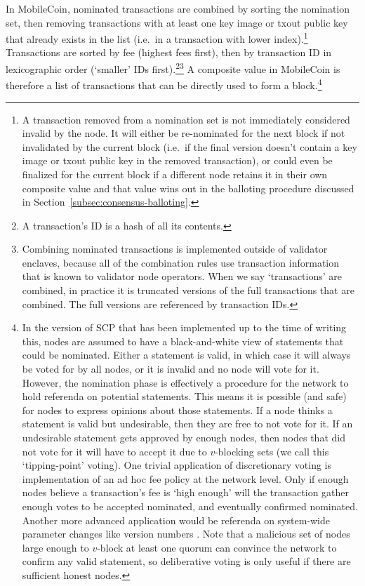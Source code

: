 In MobileCoin, nominated transactions are combined by sorting the nomination set, then removing transactions with at least one key image or txout public key that already exists in the list (i.e.\ in a transaction with lower index).\footnote{A transaction removed from a nomination set is not immediately considered invalid by the node. It will either be re-nominated for the next block if not invalidated by the current block (i.e.\ if the final version doesn't contain a key image or txout public key in the removed transaction), or could even be finalized for the current block if a different node retains it in their own composite value and that value wins out in the balloting procedure discussed in Section~\ref{subsec:consensus-balloting}.} Transactions are sorted by fee (highest fees first), then by transaction ID in lexicographic order (`smaller' IDs first).\footnote{A transaction's ID is a hash of all its contents.}\footnote{Combining nominated transactions is implemented outside of validator enclaves, because all of the combination rules use transaction information that is known to validator node operators. When we say `transactions' are combined, in practice it is truncated versions of the full transactions that are combined. The full versions are referenced by transaction IDs.} A composite value in MobileCoin is therefore a list of transactions that can be directly used to form a block.\footnote{\label{footnote:scp-tipping-point-voting}In the version of SCP that has been implemented up to the time of writing this, nodes are assumed to have a black-and-white view of statements that could be nominated. Either a statement is valid, in which case it will always be voted for by all nodes, or it is invalid and no node will vote for it. However, the nomination phase is effectively a procedure for the network to hold referenda on potential statements. This means it is possible (and safe) for nodes to express opinions about those statements. If a node thinks a statement is valid but undesirable, then they are free to not vote for it. If an undesirable statement gets approved by enough nodes, then nodes that did not vote for it will have to accept it due to $v$-blocking sets (we call this `tipping-point' voting). One trivial application of discretionary voting is implementation of an ad hoc fee policy at the network level. Only if enough nodes believe a transaction's fee is `high enough' will the transaction gather enough votes to be accepted nominated, and eventually confirmed nominated. Another more advanced application would be referenda on system-wide parameter changes like version numbers \cite{rfc-mobilecoin-hardforks}. Note that a malicious set of nodes large enough to $v$-block at least one quorum can convince the network to confirm any valid statement, so deliberative voting is only useful if there are sufficient honest nodes.}

